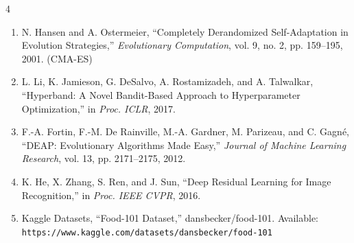 \documentclass[a0,landscape]{a0poster}
\begin{document}
\begin{multicols*}{4}
\begin{enumerate}
\item N. Hansen and A. Ostermeier, ``Completely Derandomized Self-Adaptation in Evolution Strategies,'' \textit{Evolutionary Computation}, vol. 9, no. 2, pp. 159--195, 2001. (CMA-ES)



\item L. Li, K. Jamieson, G. DeSalvo, A. Rostamizadeh, and A. Talwalkar, ``Hyperband: A Novel Bandit-Based Approach to Hyperparameter Optimization,'' in \textit{Proc. ICLR}, 2017.

\item F.-A. Fortin, F.-M. De Rainville, M.-A. Gardner, M. Parizeau, and C. Gagné, ``DEAP: Evolutionary Algorithms Made Easy,'' \textit{Journal of Machine Learning Research}, vol. 13, pp. 2171--2175, 2012.

\item K. He, X. Zhang, S. Ren, and J. Sun, ``Deep Residual Learning for Image Recognition,'' in \textit{Proc. IEEE CVPR}, 2016.

\item Kaggle Datasets, ``Food-101 Dataset,'' dansbecker/food-101.  
Available: \texttt{https://www.kaggle.com/datasets/dansbecker/food-101}
\end{enumerate}



\end{multicols*}
\end{document}
